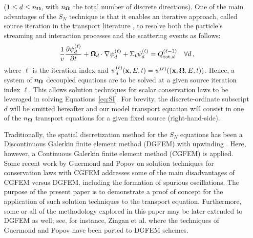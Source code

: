 ($1 \le d \le n_{\mathbf{\Omega}}$, with $n_{\mathbf{\Omega}}$ the total number of discrete directions). One of the
main advantages of the $S_N$ technique is that it enables an iterative approach, called source iteration
in the transport literature \cite{glasstone,lewis,duderstadt}, to resolve
both the particle's streaming and interaction processes and the scattering events as follows:
\begin{equation} \label{eq:SI}
  \frac{1}{v}\frac{\partial \psi_d^{(\ell)}}{\partial t}
    + \mathbf{\Omega}_{d}\cdot\nabla\psi_d^{(\ell)}
    + \Sigma_\textup{t}\psi_d^{(\ell)} = Q_{\textup{tot},d}^{(\ell-1)} \quad \forall d \,,
\end{equation}
where $\ell$ is the iteration index and $\psi_d^{(\ell)}(\mathbf{x},E,t) = \psi^{(\ell)}((\mathbf{x},\mathbf{\Omega},E,t))$.
Hence, a system of $n_{\mathbf{\Omega}}$ decoupled equations are to be solved
at a given source iteration index $\ell$. This allows solution techniques for scalar conservation
laws to be leveraged in solving Equations~\eqref{eq:SI}. For brevity, the discrete-ordinate subscript $d$
will be omitted hereafter and our model transport equation will consist in one of the $n_{\mathbf{\Omega}}$ transport
equations for a given fixed source (right-hand-side).

Traditionally, the spatial discretization method for the $S_N$
equations has been a Discontinuous Galerkin finite element method (DGFEM) with upwinding
\cite{Lesaint1974,Reed_Hill_1973}. Here, however,
a Continuous Galerkin finite element method (CGFEM) is applied.
Some recent work by Guermond and Popov \cite{guermond_ev} on
solution techniques for conservation laws with CGFEM addresses some
of the main disadvantages of CGFEM versus DGFEM, including the formation
of spurious oscillations. The purpose of the present paper is to demonstrate a proof of concept
for the application of such solution techniques to the transport equation.
Furthermore, some or all of the methodology explored in this paper may be
later extended to DGFEM as well; see, for instance, Zingan et al. \cite{zingan_2013}
where the techniques of Guermond and Popov \cite{guermond_ev} have been ported to DGFEM schemes.

